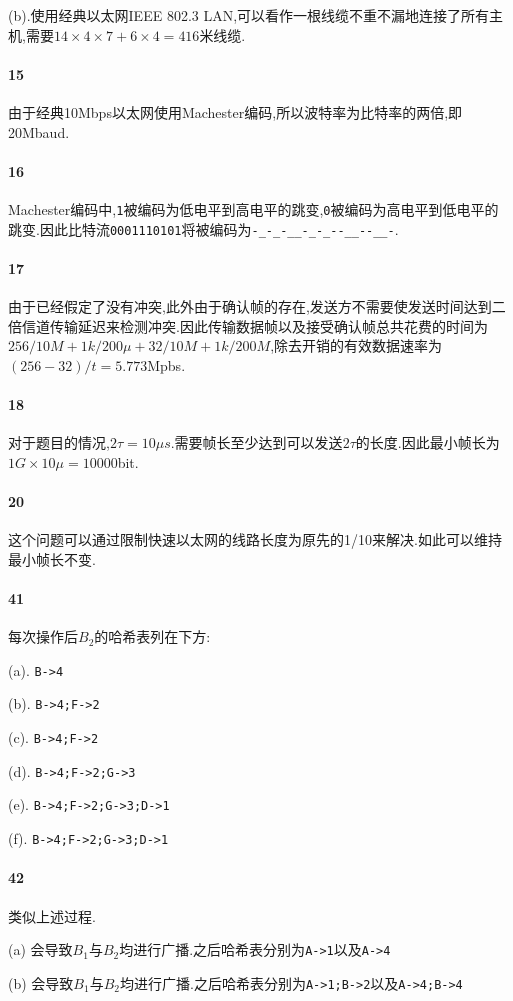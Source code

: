 \documentclass[a4paper]{article}
\begin{document}
(b).使用经典以太网IEEE 802.3 LAN,可以看作一根线缆不重不漏地连接了所有主机,需要$14\times4\times7+6\times4=416$米线缆.
\paragraph{15}
由于经典10Mbps以太网使用Machester编码,所以波特率为比特率的两倍,即20Mbaud.
\paragraph{16}
Machester编码中,\verb|1|被编码为低电平到高电平的跳变,\verb|0|被编码为高电平到低电平的跳变.因此比特流\verb|0001110101|将被编码为\verb|-_-_-__-_-_--__--__-|.
\paragraph{17}
由于已经假定了没有冲突,此外由于确认帧的存在,发送方不需要使发送时间达到二倍信道传输延迟来检测冲突.因此传输数据帧以及接受确认帧总共花费的时间为$256/10M+1k/200\mu+32/10M+1k/200M$,除去开销的有效数据速率为$(256-32)/t=5.773$Mpbs.
\paragraph{18}
对于题目的情况,$2\tau=10\mu s$.需要帧长至少达到可以发送$2\tau$的长度.因此最小帧长为$1G\times10\mu=10000$bit.
\paragraph{20}
这个问题可以通过限制快速以太网的线路长度为原先的1/10来解决.如此可以维持最小帧长不变.
\paragraph{41}
每次操作后$B_2$的哈希表列在下方:

(a). \verb|B->4|

(b). \verb|B->4;F->2|

(c). \verb|B->4;F->2|

(d). \verb|B->4;F->2;G->3|

(e). \verb|B->4;F->2;G->3;D->1|

(f). \verb|B->4;F->2;G->3;D->1|
\paragraph{42}
类似上述过程.

(a) 会导致$B_1$与$B_2$均进行广播.之后哈希表分别为\verb|A->1|以及\verb|A->4|

(b) 会导致$B_1$与$B_2$均进行广播.之后哈希表分别为\verb|A->1;B->2|以及\verb|A->4;B->4|
\end{document}
